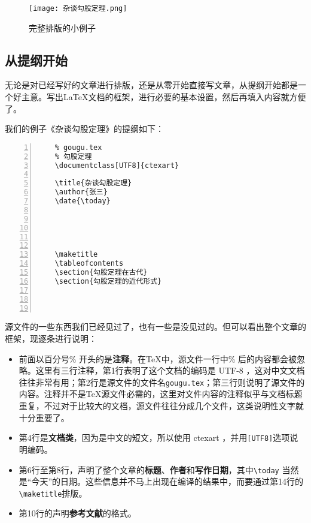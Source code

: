 \begin{figure}
    \centering
    \texttt{[image: 杂谈勾股定理.png]}
    \caption{完整排版的小例子}
    \label{fig:gougu}
\end{figure}
\subsection{从提纲开始}

无论是对已经写好的文章进行排版，还是从零开始直接写文章，从提纲开始都是一个好主意。写出\LaTeX 文档的框架，进行必要的基本设置，然后再填入内容就方便了。

我们的例子《杂谈勾股定理》的提纲如下：

\begin{lstlisting}[numbers=left]
    % -*- coding: UTF-8 -*-
    % gougu.tex
    % 勾股定理
    \documentclass[UTF8]{ctexart}

    \title{杂谈勾股定理}
    \author{张三}
    \date{\today}

    

    

    \maketitle
    \tableofcontents
    \section{勾股定理在古代}
    \section{勾股定理的近代形式}
    

    
\end{lstlisting}

源文件的一些东西我们已经见过了，也有一些是没见过的。但可以看出整个文章的框架，现逐条进行说明：

\begin{itemize}
    \item 前面以百分号\% 开头的是\textbf{注释}。在\TeX 中，源文件一行中\% 后的内容都会被忽略。这里有三行注释，第1行表明了这个文档的编码是 UTF-8 ，这对中文文档往往非常有用；第2行是源文件的文件名\verb|gougu.tex|；第三行则说明了源文件的内容。注释并不是\TeX 源文件必需的，这里对文件内容的注释似乎与文档标题重复，不过对于比较大的文档，源文件往往分成几个文件，这类说明性文字就十分重要了。
    \item 第4行是\textbf{文档类}，因为是中文的短文，所以使用 ctexart ，并用\verb|[UTF8]|选项说明编码。
    \item 第6行至第8行，声明了整个文章的\textbf{标题}、\textbf{作者}和\textbf{写作日期}，其中\verb|\today| 当然是“今天”的日期。这些信息并不马上出现在编译的结果中，而要通过第14行的\verb|\maketitle|排版。
    \item 第10行的\verb||声明\textbf{参考文献}的格式。
\end{itemize}


